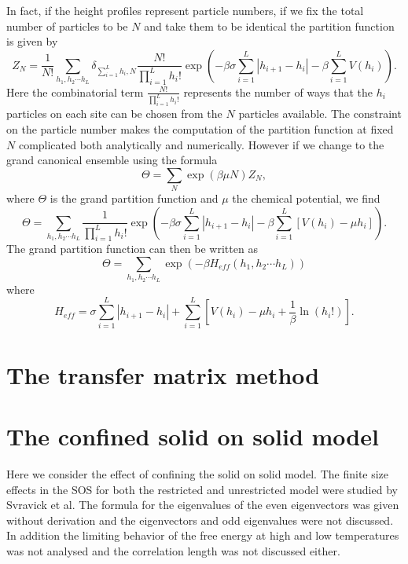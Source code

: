 In fact, if the height profiles represent particle numbers, if we fix the total number of particles to be $N$ and take them to be identical the partition function is given by
\begin{equation}
Z_N = \frac{1}{N!}\sum_{h_1,h_2\cdots h_L} \delta_{\sum_{i=1}^L h_i, N}\frac{N!}{\prod_{i=1}^L h_i!} \exp\left(-\beta \sigma \sum_{i=1}^L |h_{i+1}-h_i| -\beta\sum_{i=1}^L V(h_i)\right).
\end{equation}
Here the combinatorial term $\frac{N!}{\prod_{i=1}^L h_i!}$ represents the number of ways that the $h_i$ particles on each site can be chosen from the $N$ particles available. The constraint on the particle number makes the computation of the partition function at fixed $N$ complicated both analytically and numerically. However if we change to the grand canonical ensemble using
the formula
\begin{equation}
\Theta = \sum_{N} \exp(\beta\mu N) Z_N,
\end{equation}
where $\Theta$ is the grand partition function and $\mu$ the chemical potential, we find
\begin{equation}
\Theta = \sum_{h_1,h_2\cdots h_L} \frac{1}{\prod_{i=1}^L h_i!} \exp\left(-\beta \sigma \sum_{i=1}^L |h_{i+1}-h_i| -\beta\sum_{i=1}^L[ V(h_i)-\mu h_i]\right).
\end{equation}
The grand partition function can then be written as 
\begin{equation}
\Theta = \sum_{h_1,h_2\cdots h_L} \exp\left(-\beta H_{eff}(h_1,h_2\cdots h_L)\right)
\end{equation}
where 
\begin{equation}
H_{eff}= \sigma \sum_{i=1}^L |h_{i+1}-h_i| +\sum_{i=1}^L [V(h_i)-\mu h_i +\frac{1}{\beta}\ln(h_i !)].
\end{equation}

\section{The transfer matrix method}


\section{The confined solid on solid model}
Here we consider the effect of confining the solid on solid model. The finite size effects in the SOS for both the restricted and unrestricted model were studied by Svravick et al. The formula for the eigenvalues of the even eigenvectors was given without derivation and the eigenvectors and odd eigenvalues were not discussed. In addition the limiting behavior of the free energy at high and low temperatures was not analysed and the correlation length was not discussed either. 

